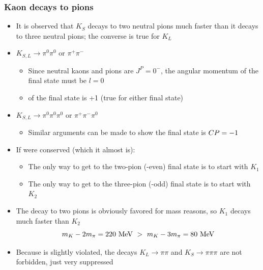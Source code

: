   \subsubsection{Kaon decays to pions}
  \begin{itemize}
    \item It is observed that $K_S$ decays to two neutral pions much faster than it decays to three neutral pions; the converse is true for $K_L$
    \item $K_{S,L}\rightarrow \pi^0\pi^0$ or $\pi^+\pi^-$
    \begin{itemize}
      \item Since neutral kaons and pions are $J^P = 0^-$, the angular momentum of the final state must be $l=0$
      \item \thus \CP of the final state is +1 (true for either final state)
    \end{itemize}
    \item $K_{S,L} \rightarrow \pi^0\pi^0\pi^0$ or $\pi^+\pi^-\pi^0$
    \begin{itemize}
      \item Similar arguments can be made to show the final state is $CP = -1$
    \end{itemize}
    \item If \CP were conserved (which it almost is):
    \begin{itemize}
      \item The only way to get to the two-pion (\CP-even) final state is to start with $K_1$
      \item The only way to get to the three-pion (\CP-odd) final state is to start with $K_2$
    \end{itemize}
    \item The decay to two pions is obviously favored for mass reasons, so $K_1$ decays much faster than $K_2$
    \begin{equation}
      m_K - 2m_\pi = 220~\text{MeV} ~ > ~ m_K - 3m_\pi = 80~\text{MeV}
    \end{equation}
    \item Because \CP is slightly violated, the decays $K_L\rightarrow \pi\pi$ and $K_S \rightarrow \pi\pi\pi$ are not forbidden, just very suppressed
  \end{itemize}

